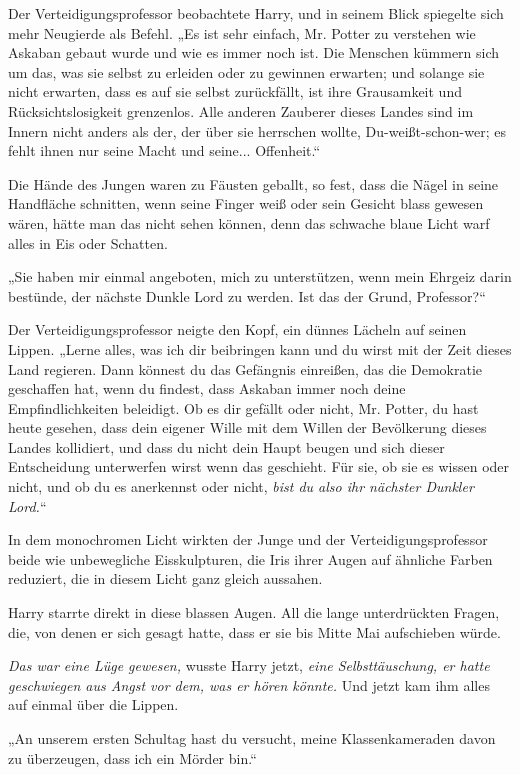 {Der Verteidigungsprofessor beobachtete Harry, und in seinem Blick spiegelte sich mehr Neugierde als Befehl. „Es ist sehr einfach, Mr. Potter zu verstehen wie Askaban gebaut wurde und wie es immer noch ist. Die Menschen kümmern sich um das, was sie selbst zu erleiden oder zu gewinnen erwarten; und solange sie nicht erwarten, dass es auf sie selbst zurückfällt, ist ihre Grausamkeit und Rücksichtslosigkeit grenzenlos. Alle anderen Zauberer dieses Landes sind im Innern nicht anders als der, der über sie herrschen wollte, Du-weißt-schon-wer; es fehlt ihnen nur seine Macht und seine... Offenheit.“

Die Hände des Jungen waren zu Fäusten geballt, so fest, dass die Nägel in seine Handfläche schnitten, wenn seine Finger weiß oder sein Gesicht blass gewesen wären, hätte man das nicht sehen können, denn das schwache blaue Licht warf alles in Eis oder Schatten.

„Sie haben mir einmal angeboten, mich zu unterstützen, wenn mein Ehrgeiz darin bestünde, der nächste Dunkle Lord zu werden. Ist das der Grund, Professor?“

Der Verteidigungsprofessor neigte den Kopf, ein dünnes Lächeln auf seinen Lippen. „Lerne alles, was ich dir beibringen kann und du wirst mit der Zeit dieses Land regieren. Dann könnest du das Gefängnis einreißen, das die Demokratie geschaffen hat, wenn du findest, dass Askaban immer noch deine Empfindlichkeiten beleidigt. Ob es dir gefällt oder nicht, Mr. Potter, du hast heute gesehen, dass dein eigener Wille mit dem Willen der Bevölkerung dieses Landes kollidiert, und dass du nicht dein Haupt beugen und sich dieser Entscheidung unterwerfen wirst wenn das geschieht. Für sie, ob sie es wissen oder nicht, und ob du es anerkennst oder nicht, \emph{bist du also ihr nächster Dunkler Lord.}“

In dem monochromen Licht wirkten der Junge und der Verteidigungsprofessor beide wie unbewegliche Eisskulpturen, die Iris ihrer Augen auf ähnliche Farben reduziert, die in diesem Licht ganz gleich aussahen.

Harry starrte direkt in diese blassen Augen. All die lange unterdrückten Fragen, die, von denen er sich gesagt hatte, dass er sie bis Mitte Mai aufschieben würde.

\emph{Das war eine Lüge gewesen,} wusste Harry jetzt, \emph{eine Selbsttäuschung, er hatte geschwiegen aus Angst vor dem, was er hören könnte.} Und jetzt kam ihm alles auf einmal über die Lippen.

„An unserem ersten Schultag hast du versucht, meine Klassenkameraden davon zu überzeugen, dass ich ein Mörder bin.“

}
